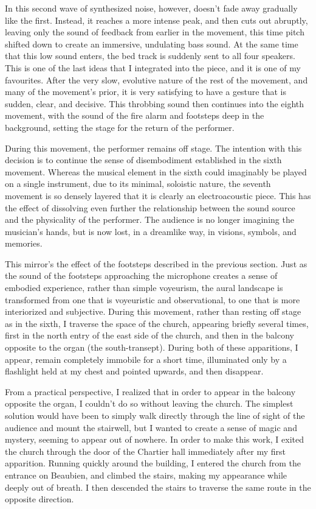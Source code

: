 \documentclass[12pt,twoside,maitrise]{dms_ks}
\theoremstyle{definition}
\begin{document}
{In this second wave of synthesized  noise, however, doesn't fade away gradually like the first. 
Instead, it reaches a more intense peak, and then cuts out abruptly, leaving only the sound of feedback from earlier in the movement, this time pitch shifted down to create an immersive, undulating bass sound. 
At the same time that this low sound enters, the bed track is suddenly sent to all four speakers. 
This is one of the last ideas that I integrated into the piece, and it is one of my favourites. 
After the very slow, evolutive nature of the rest of the movement, and many of the movement's prior, it is very satisfying to have a gesture that is sudden, clear, and decisive. 
This throbbing sound then continues into the eighth movement, with the sound of the fire alarm and footsteps deep in the background, setting the stage for the return of the performer.

During this movement, the performer remains off stage. 
The intention with this decision is to continue the sense of disembodiment established in the sixth movement. 
Whereas the musical element in the sixth could imaginably be played on a single instrument, due to its minimal, soloistic nature, the seventh movement is so densely layered that it is clearly an electroacoustic piece. 
This has the effect of dissolving even further the relationship between the sound source and the physicality of the performer. 
The audience is no longer imagining the musician’s hands, but is now lost, in a dreamlike way, in visions, symbols, and memories. 

This mirror’s the effect of the footsteps described in the previous section. 
Just as the sound of the footsteps approaching the microphone creates a sense of embodied experience, rather than simple voyeurism, the aural landscape is transformed from one that is voyeuristic and observational, to one that is more interiorized and subjective. 
During this movement, rather than resting off stage as in the sixth, I traverse the space of the church, appearing briefly several times, first in the north entry of the east side of the church, and then in the balcony opposite to the organ (the south-transept). 
During both of these apparitions, I appear, remain completely immobile for a short time, illuminated only by a flashlight held at my chest and pointed upwards, and then disappear.

From a practical perspective, I realized that in order to appear in the balcony opposite the organ, I couldn't do so without leaving the church. 
The simplest solution would have been to simply walk directly through the line of sight of the audience and mount the stairwell, but I wanted to create a sense of magic and mystery, seeming to appear out of nowhere. 
In order to make this work, I exited the church through the door of the Chartier hall immediately after my first apparition. 
Running quickly around the building, I entered the church from the entrance on Beaubien, and climbed the stairs, making my appearance while deeply out of breath. 
I then descended the stairs to traverse the same route in the opposite direction.

}
\end{document}
